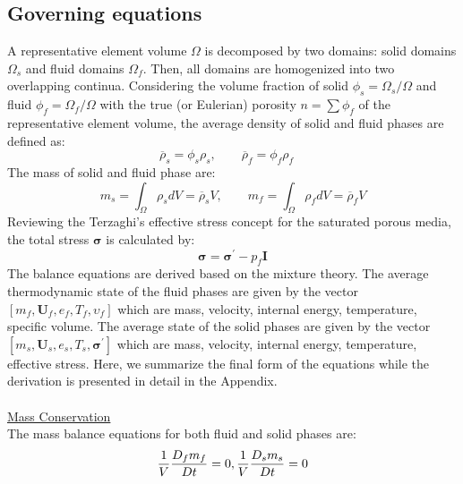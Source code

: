 \documentclass[preprint,12pt]{elsarticle}
\begin{document}
\subsection{\textsf{Governing equations}}
A representative element volume $\Omega$ is decomposed by two domains: solid domains $\Omega_s$ and fluid domains $\Omega_f$. Then, all domains are homogenized into two overlapping continua. Considering the volume fraction of solid $\phi_s = \Omega_s/\Omega$ and fluid $\phi_f = \Omega_f/\Omega$ with the true (or Eulerian) porosity $n=\sum{\phi_f}$ of the representative element volume, the average density of solid and fluid phases are defined as:\\
%
%
\begin{equation}
    \label{density} 
  \overline{\rho}_s   = \phi_s \rho_s, \qquad  \overline{\rho}_f   = \phi_f \rho_f \quad
\end{equation}
%
%
The mass of solid and fluid phase are:\\
%
%
\begin{equation}
    \label{mass} 
  m_s   = \int_{\Omega} \rho_s dV = \overline{\rho}_s V, \qquad  m_f   = \int_{\Omega} \rho_f dV = \overline{\rho}_f V
\end{equation}
%
%
Reviewing the Terzaghi's effective stress concept for the saturated porous media, the total stress $\pmb{\sigma}$ is calculated by:\\
%
%
\begin{equation}
    \label{Terzaghi} 
  \pmb{\sigma}   = \pmb{\sigma}^\prime -p_f\pmb{I}
\end{equation}
%
%
The balance equations are derived based on the mixture theory. The average thermodynamic state of the fluid phases are given by the vector $[m_f,\pmb{U}_f,e_f,T_f,\upsilon_f]$ which are mass, velocity, internal energy, temperature, specific volume. The average state of the solid phases are given by the vector $[m_s,\pmb{U}_s,e_s,T_s,\pmb{\sigma}^\prime]$ which are mass, velocity, internal energy, temperature, effective stress. Here, we summarize the final form of the equations while the derivation is presented in detail in the Appendix. \\
%
\underline{\hspace{5in}}\\
\underline{\textsf{Mass Conservation}}\\
The mass balance equations for both fluid and solid phases are:\\
%
%
\begin{equation}
    \label{massbalance}
   \frac{1}{V}\frac{D_fm_f}{Dt} = 0, \\ 
   \frac{1}{V}\frac{D_sm_s}{Dt} = 0    
\end{equation}
\end{document}
